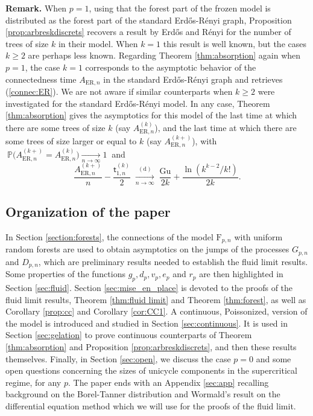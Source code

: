 \documentclass[a4, 11pt]{article}
\numberwithin{equation}{section}
\theoremstyle{plain}
\theoremstyle{definition}
\theoremstyle{remark}
\begin{document}
\textbf{Remark.} When $p=1$, using that the forest part of the frozen model is distributed as the forest part of the standard Erd\H{o}s-R\'enyi graph, Proposition \ref{prop:arbreskdiscrets} recovers a result by Erd\H{o}s and R\'enyi \cite{ErdosRenyi60} for the number of trees of size $k$ in their model. When $k=1$ this result is well known, but the cases $k\geq 2$ are perhaps less known.  Regarding  Theorem \ref{thm:absorption} again when $p=1$, the case $k=1$  corresponds to the asymptotic behavior of the connectedness time $A_{\mathrm{ER},n}$ in the standard Erd\H{o}s-R\'enyi graph and retrieves (\ref{connec:ER}). We are not aware if similar counterparts when $k\geq 2$ were investigated for the standard Erd\H{o}s-R\'enyi model. In any case,  Theorem \ref{thm:absorption} gives the asymptotics  for this model of the last time at which there are some trees of size $k$ (say $A^{(k)}_{\mathrm{ER},n}$), and the last time at which there are some trees of size larger or equal to $k$ (say $A^{(k+)}_{\mathrm{ER},n}$), with $~\mathbb P\big(A^{(k+)}_{\mathrm{ER},n} =A^{(k)}_{\mathrm{ER},n}  \big)  \underset{n \rightarrow \infty}{\rightarrow}  1~$
and
$$
\frac{A^{(k+)}_{\mathrm{ER},n} }{n} - \frac{\mathsf t^{(k)}_{1,n}}{2}  \; \underset{n \rightarrow \infty}{\overset{(\mathrm d)}\longrightarrow} \; \frac{\mathrm{Gu}}{2k}+\frac{\ln (k^{k-2}/k!)}{2k}.
$$


\subsection{Organization of the paper}

In Section \ref{section:forests}, the connections of the model $\mathrm F_{p,n}$ with uniform random forests are used to obtain asymptotics on the jumps of the processes $G_{p,n}$ and $D_{p,n}$, which are preliminary results needed to establish the fluid limit results. Some properties of the functions $g_p,d_p,v_p,e_p$ and $r_p$ are then highlighted in Section \ref{sec:fluid}. Section \ref{sec:mise_en_place} is devoted to the proofs of the fluid limit results, Theorem \ref{thm:fluid limit} and Theorem \ref{thm:forest}, as well as Corollary \ref{prop:cc} and Corollary \ref{cor:CC1}.  
A continuous, {Poissonized}, version of the model is  introduced and studied in Section \ref{sec:continuous}. It is used in Section \ref{sec:gelation} to prove continuous counterparts of Theorem \ref{thm:absorption} and Proposition \ref{prop:arbreskdiscrets}, and then these results themselves. Finally, in Section \ref{sec:open}, we discuss the case $p=0$ and some open questions concerning the sizes of unicycle components in the supercritical regime, for any $p$. The paper ends with an Appendix \ref{sec:app} recalling background on the Borel-Tanner distribution and Wormald's result on the differential equation method which we will use for the proofs of the fluid limit.
\end{document}

